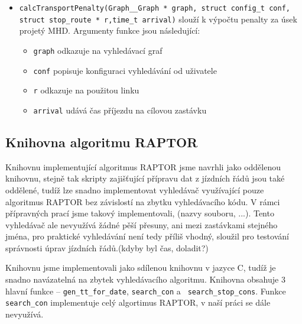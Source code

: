 \begin{itemize}
{	conf, Graph\_\_Edge * edge)} slouží k výpočtu penalty za pěší úsek.
	Argumenty funkce jsou následující:
	\begin{itemize}
		\item {\tt graph} odkazuje na vyhledávací graf
		\item {\tt conf} popisuje konfiguraci vyhledávání od uživatele
		\item {\tt edge} odkazuje na hranu, pro kterou počítáme penaltu
	\end{itemize}
	\item {\tt calcTransportPenalty(Graph\_\_Graph * graph, struct config\_t
	conf, struct stop\_route * r,time\_t arrival)} slouží k výpočtu penalty
	za úsek projetý MHD. Argumenty funkce jsou následující:
	\begin{itemize}
		\item {\tt graph} odkazuje na vyhledávací graf
		\item {\tt conf} popisuje konfiguraci vyhledávání od uživatele
		\item {\tt r} odkazuje na použitou linku
		\item {\tt arrival} udává čas příjezdu na cílovou zastávku
	\end{itemize}
\end{itemize}

\subsection{Knihovna algoritmu RAPTOR}
Knihovnu implementující algoritmus RAPTOR jsme navrhli jako oddělenou knihovnu,
stejně tak skripty zajišťující přípravu dat z jízdních řádů jsou také oddělené,
tudíž lze snadno implementovat vyhledávač využívající pouze algoritmus RAPTOR
bez závislostí na zbytku vyhledávacího kódu. V rámci přípravných prací jsme
takový implementovali, (\TODO nazvy souboru, ...). Tento vyhledávač ale
nevyužívá žádné pěší přesuny, ani mezi zastávkami stejného jména, pro praktické
vyhledávání není tedy příliš vhodný, sloužil pro testování správnosti úprav
jízdních řádů.(\TODO kdyby byl čas, doladit?)

Knihovnu jsme implementovali jako sdílenou knihovnu v jazyce C, tudíž je snadno
navázatelná na zbytek vyhledávacího algoritmu. Knihovna obsahuje 3 hlavní
funkce -- {\tt gen\_tt\_for\_date}, {\tt search\_con} a {\tt
search\_stop\_cons}. Funkce {\tt search\_con} implementuje celý algortimus
RAPTOR, v naší práci se dále nevyužívá.

